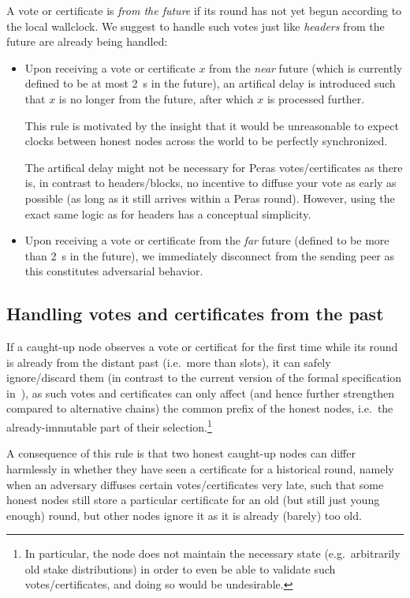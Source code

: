 A vote or certificate is \emph{from the future} if its round has not yet begun according to the local wallclock.
We suggest to handle such votes just like \emph{headers} from the future are already being handled:
\begin{itemize}
\item
  Upon receiving a vote or certificate $x$ from the \emph{near} future (which is currently defined to be at most \qty{2}{\s} in the future), an artifical delay is introduced such that $x$ is no longer from the future, after which $x$ is processed further.

  This rule is motivated by the insight that it would be unreasonable to expect clocks between honest nodes across the world to be perfectly synchronized.

  The artifical delay might not be necessary for Peras votes/certificates as there is, in contrast to headers/blocks, no incentive to diffuse your vote as early as possible (as long as it still arrives within a Peras round).
  However, using the exact same logic as for headers has a conceptual simplicity.
\item
  Upon receiving a vote or certificate from the \emph{far} future (defined to be more than \qty{2}{\s} in the future), we immediately disconnect from the sending peer as this constitutes adversarial behavior.
\end{itemize}

\subsection{Handling votes and certificates from the past}\label{sec:votes certs from the past}

If a caught-up node observes a vote or certificat for the first time while its round is already from the distant past (i.e.\ more than \Tcp{} slots), it can safely ignore/discard them (in contrast to the current version of the formal specification in~\cite{peras-cip}), as such votes and certificates can only affect (and hence further strengthen compared to alternative chains) the common prefix of the honest nodes, i.e.\ the already-immutable part of their selection.\footnote{
  In particular, the node does not maintain the necessary state (e.g.\ arbitrarily old stake distributions) in order to even be able to validate such votes/certificates, and doing so would be undesirable.}

A consequence of this rule is that two honest caught-up nodes can differ harmlessly in whether they have seen a certificate for a historical round, namely when an adversary diffuses certain votes/certificates very late, such that some honest nodes still store a particular certificate for an old (but still just young enough) round, but other nodes ignore it as it is already (barely) too old.

